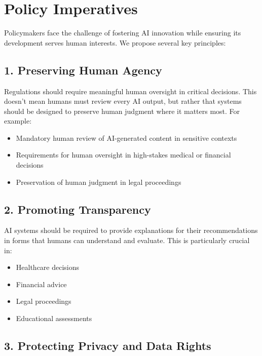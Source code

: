 \documentclass[
  Letterpaper,
]{scrbook}
\providecommand{\tightlist}{%
  \setlength{\itemsep}{0pt}\setlength{\parskip}{0pt}}\usepackage{longtable,booktabs,array}
\begin{document}
\section{Policy Imperatives}\label{policy-imperatives}

Policymakers face the challenge of fostering AI innovation while
ensuring its development serves human interests. We propose several key
principles:

\subsection{1. Preserving Human Agency}\label{preserving-human-agency}

Regulations should require meaningful human oversight in critical
decisions. This doesn't mean humans must review every AI output, but
rather that systems should be designed to preserve human judgment where
it matters most. For example:

\begin{itemize}
\tightlist
\item
  Mandatory human review of AI-generated content in sensitive contexts
\item
  Requirements for human oversight in high-stakes medical or financial
  decisions
\item
  Preservation of human judgment in legal proceedings
\end{itemize}

\subsection{2. Promoting Transparency}\label{promoting-transparency}

AI systems should be required to provide explanations for their
recommendations in forms that humans can understand and evaluate. This
is particularly crucial in:

\begin{itemize}
\tightlist
\item
  Healthcare decisions
\item
  Financial advice
\item
  Legal proceedings
\item
  Educational assessments
\end{itemize}

\subsection{3. Protecting Privacy and Data
Rights}\label{protecting-privacy-and-data-rights}
\end{document}

